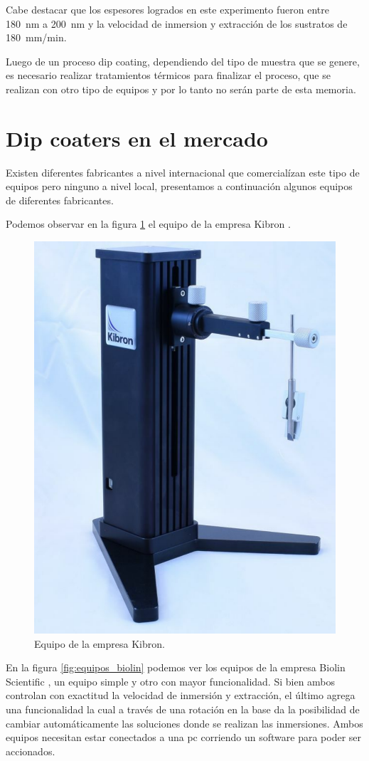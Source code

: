 

Cabe destacar que los espesores logrados en este experimento fueron entre \SI{180}{nm} a \SI{200}{nm} y la velocidad de inmersion y extracción de los sustratos de \SI{180}{mm/min}.

Luego de un proceso dip coating, dependiendo del tipo de muestra que se genere, es necesario realizar tratamientos térmicos para finalizar el proceso, que se realizan con otro tipo de equipos y por lo tanto no serán parte de esta memoria.
 
\label{sec:dip coating}

\section{Dip coaters en el mercado}

Existen diferentes fabricantes a nivel internacional que comercialízan este tipo de equipos pero ninguno a nivel local, presentamos a continuación algunos equipos de diferentes fabricantes. 

Podemos observar en la figura \ref{fig:dip_kibron} el equipo de la empresa Kibron \citep{2_web_kibron}.

\begin{figure}[htbp]
	\centering
	\includegraphics[width=.25\textwidth]{./Figures/kibron.pdf}
	\caption{Equipo de la empresa Kibron.}
	\label{fig:dip_kibron}
\end{figure}

En la figura \ref{fig:equipos_biolin} podemos ver los equipos de la empresa Biolin Scientific  \citep{1_web_biolin}, un equipo simple y otro con mayor funcionalidad. Si bien ambos controlan con exactitud la velocidad de inmersión y extracción, el último agrega una funcionalidad la cual a través de una rotación en la base da la posibilidad de cambiar automáticamente las soluciones donde se realizan las inmersiones. Ambos equipos necesitan estar conectados a una pc corriendo un software para poder ser accionados.

